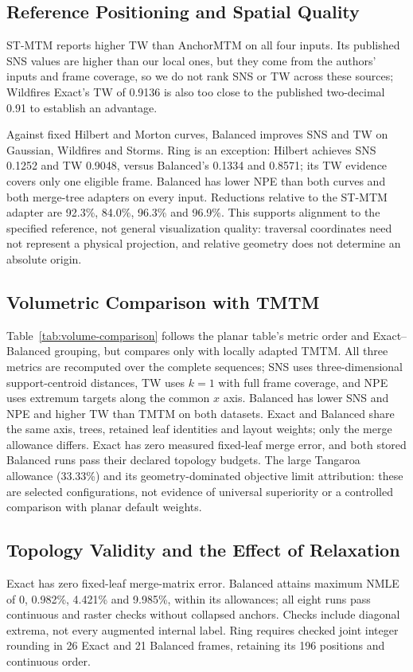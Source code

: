 \documentclass[review]{vgtc}
\begin{document}
\subsection{Reference Positioning and Spatial Quality}

ST-MTM reports higher TW than AnchorMTM on all four inputs. Its published SNS values are higher than our local ones, but they come from the authors' inputs and frame coverage, so we do not rank SNS or TW across these sources; Wildfires Exact's TW of 0.9136 is also too close to the published two-decimal 0.91 to establish an advantage.

Against fixed Hilbert and Morton curves, Balanced improves SNS and TW on Gaussian, Wildfires and Storms. Ring is an exception: Hilbert achieves SNS 0.1252 and TW 0.9048, versus Balanced's 0.1334 and 0.8571; its TW evidence covers only one eligible frame. Balanced has lower NPE than both curves and both merge-tree adapters on every input. Reductions relative to the ST-MTM adapter are 92.3\%, 84.0\%, 96.3\% and 96.9\%. This supports alignment to the specified reference, not general visualization quality: traversal coordinates need not represent a physical projection, and relative geometry does not determine an absolute origin.

\subsection{Volumetric Comparison with TMTM}

Table~\ref{tab:volume-comparison} follows the planar table's metric order and Exact--Balanced grouping, but compares only with locally adapted TMTM. All three metrics are recomputed over the complete sequences; SNS uses three-dimensional support-centroid distances, TW uses $k=1$ with full frame coverage, and NPE uses extremum targets along the common $x$ axis. Balanced has lower SNS and NPE and higher TW than TMTM on both datasets. Exact and Balanced share the same axis, trees, retained leaf identities and layout weights; only the merge allowance differs. Exact has zero measured fixed-leaf merge error, and both stored Balanced runs pass their declared topology budgets. The large Tangaroa allowance (33.33\%) and its geometry-dominated objective limit attribution: these are selected configurations, not evidence of universal superiority or a controlled comparison with planar default weights.

\subsection{Topology Validity and the Effect of Relaxation}
Exact has zero fixed-leaf merge-matrix error. Balanced attains maximum NMLE of 0, 0.982\%, 4.421\% and 9.985\%, within its allowances; all eight runs pass continuous and raster checks without collapsed anchors. Checks include diagonal extrema, not every augmented internal label. Ring requires checked joint integer rounding in 26 Exact and 21 Balanced frames, retaining its 196 positions and continuous order.
\end{document}
